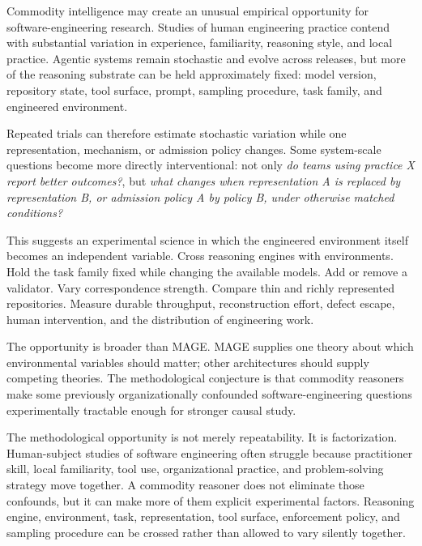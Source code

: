 

Commodity intelligence may create an unusual empirical opportunity for software-engineering research. Studies of human engineering practice contend with substantial variation in experience, familiarity, reasoning style, and local practice. Agentic systems remain stochastic and evolve across releases, but more of the reasoning substrate can be held approximately fixed: model version, repository state, tool surface, prompt, sampling procedure, task family, and engineered environment.

Repeated trials can therefore estimate stochastic variation while one representation, mechanism, or admission policy changes. Some system-scale questions become more directly interventional: not only \emph{do teams using practice X report better outcomes?}, but \emph{what changes when representation A is replaced by representation B, or admission policy A by policy B, under otherwise matched conditions?}

This suggests an experimental science in which the engineered environment itself becomes an independent variable. Cross reasoning engines with environments. Hold the task family fixed while changing the available models. Add or remove a validator. Vary correspondence strength. Compare thin and richly represented repositories. Measure durable throughput, reconstruction effort, defect escape, human intervention, and the distribution of engineering work.

The opportunity is broader than MAGE. MAGE supplies one theory about which environmental variables should matter; other architectures should supply competing theories. The methodological conjecture is that commodity reasoners make some previously organizationally confounded software-engineering questions experimentally tractable enough for stronger causal study.

The methodological opportunity is not merely repeatability. It is factorization. Human-subject studies of software engineering often struggle because practitioner skill, local familiarity, tool use, organizational practice, and problem-solving strategy move together. A commodity reasoner does not eliminate those confounds, but it can make more of them explicit experimental factors. Reasoning engine, environment, task, representation, tool surface, enforcement policy, and sampling procedure can be crossed rather than allowed to vary silently together.

